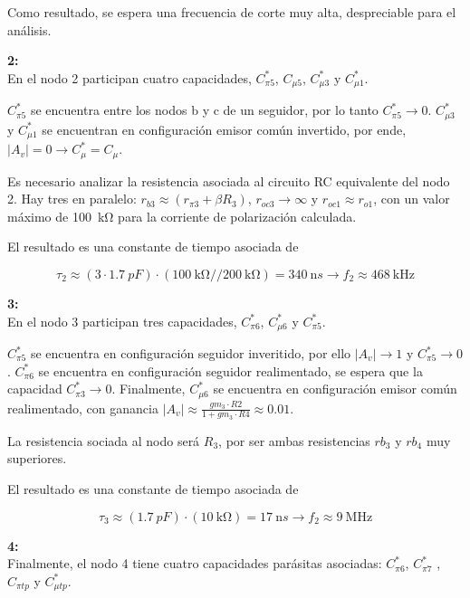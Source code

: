 \documentclass[]{article}
\begin{document}
	Como resultado, se espera una frecuencia de corte muy alta, despreciable para el análisis.
	
	\textbf{2:}\\
	En el nodo 2 participan cuatro capacidades, $C_{\pi5}^*$, $C_{\mu5}$, $C_{\mu3}^*$ y $C_{\mu1}^*$.
	
	$C_{\pi5}^*$ se encuentra entre los nodos b y c de un seguidor, por lo tanto $C_{\pi5}^* \rightarrow 0$. $C_{\mu3}^*$ y $C_{\mu1}^*$ se encuentran en configuración emisor común invertido, por ende, $|A_v| = 0 \rightarrow C_{\mu}^* = C_{\mu}$. 
	
	Es necesario analizar la resistencia asociada al circuito RC equivalente del nodo 2. 
	Hay tres en paralelo: 
	$ r_{b3} \approx (r_{\pi 3} + \beta R_3)$, 
	$ r_{oc3} \to \infty$ 
	y $ r_{oc1} \approx r_{o1}$, 
	con un valor máximo de \SI{100}{\kilo\ohm} para la corriente de polarización calculada.
	
	El resultado es una constante de tiempo asociada de
	
	\begin{equation}
		\tau_2 \approx (3\cdot \SI{1.7}{pF}) \cdot (\SI{100}{\kilo\ohm} // \SI{200}{\kilo\ohm}) = \SI{340}{\nano s} \to f_2 \approx \SI{468}{\kilo\hertz}
		\label{eq:tau2}
	\end{equation}
	
	\textbf{3:}\\
	En el nodo 3 participan tres capacidades, $C_{\pi6}^*$, $C_{\mu6}^*$ y $C_{\pi5}^*$.
	
	$C_{\pi5}^*$ se encuentra en configuración seguidor inveritido, por ello $|A_v| \to 1$ y $C_{\pi5}^* \to 0$. $C_{\pi6}^*$ se encuentra en configuración seguidor realimentado, se espera que la capacidad $C_{\pi3}^* \to 0$. Finalmente, $C_{\mu6}^*$ se encuentra en configuración emisor común realimentado, con ganancia $|A_v| \approx \frac{gm_3 \cdot R2}{1+gm_3\cdot R4} \approx 0.01$.
	
	La resistencia sociada al nodo será $R_3$, por ser ambas resistencias $rb_3$ y $rb_4$ muy superiores.
	
	El resultado es una constante de tiempo asociada de

	\begin{equation}
		\tau_3 \approx (\SI{1.7}{pF}) \cdot (\SI{10}{\kilo\ohm}) = \SI{17}{\nano s} \to f_2 \approx \SI{9}{\mega\hertz}
	\end{equation}
	
	\textbf{4:}\\
	Finalmente, el nodo 4 tiene cuatro capacidades parásitas asociadas: $C_{\pi6}^*$, $C_{\pi7}^*$ , $C_{\pi tp}$ y $C_{\mu tp}^*$.
	
\end{document}
